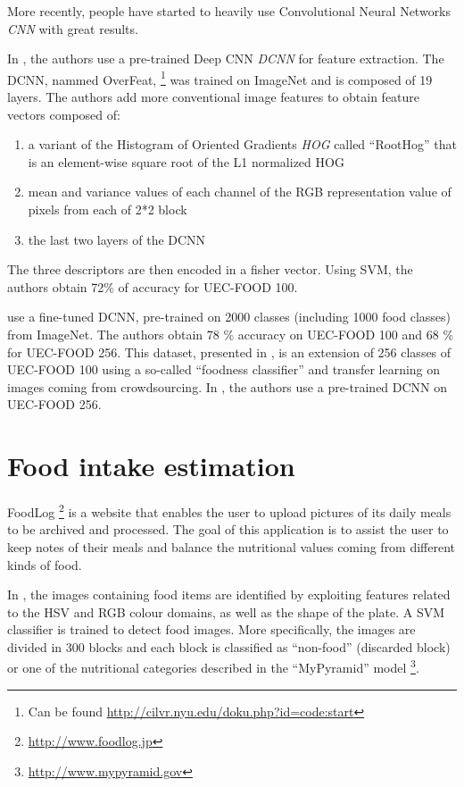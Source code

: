 
More recently, people have started to heavily use Convolutional Neural Networks \textit{CNN} with great results.

In \cite{Kawano2014}, the authors use a pre-trained Deep CNN \textit{DCNN} for feature extraction. The DCNN, nammed OverFeat, \footnote{Can be found \url{http://cilvr.nyu.edu/doku.php?id=code:start}} was trained on ImageNet and is composed of 19 layers. The authors add more conventional image features to obtain feature vectors composed of: 
\begin{enumerate}
    \item a variant of the Histogram of Oriented Gradients \textit{HOG} called \enquote{RootHog} that is an element-wise square root of the L1 normalized HOG
    \item mean and variance values of each channel of the RGB representation value of pixels from each of 2*2  block
    \item the last two layers of the DCNN
\end{enumerate}
The three descriptors are then encoded in a fisher vector. Using SVM, the authors obtain 72\% of accuracy for UEC-FOOD 100.

\cite{Yanai2015} use a fine-tuned DCNN, pre-trained on 2000 classes (including 1000 food classes) from ImageNet. The authors obtain 78 \% accuracy on UEC-FOOD 100 and 68 \% for UEC-FOOD 256. This dataset, presented in \cite{Kawano2015}, is an extension of 256 classes of UEC-FOOD 100 using a so-called \enquote{foodness classifier} and transfer learning on images coming from crowdsourcing.
In \cite{Bolanos2016}, the authors use a pre-trained DCNN on UEC-FOOD 256.

\section{Food intake estimation}


FoodLog \footnote{\url{http://www.foodlog.jp}} is a website that enables the user to upload pictures of its daily meals to be archived and processed. The goal of this application is to assist the user to keep notes of their meals and balance the nutritional values coming from different kinds of food.

In \cite{Kitamura2008}, the images containing food items are identified by exploiting features related to the HSV and RGB colour domains, as well as the shape of the plate. A SVM classifier is trained to detect food images. More specifically, the images are divided in 300 blocks and each block is classified as \enquote{non-food} (discarded block) or one of the nutritional categories described in the \enquote{MyPyramid} model \footnote{\url{http://www.mypyramid.gov}}.

